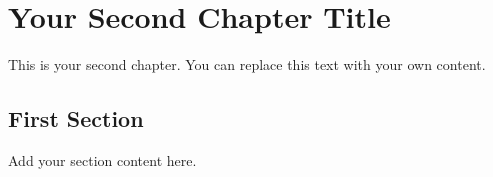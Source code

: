 \chapter{Your Second Chapter Title}

This is your second chapter. You can replace this text with your own content.

\section{First Section}
Add your section content here.
